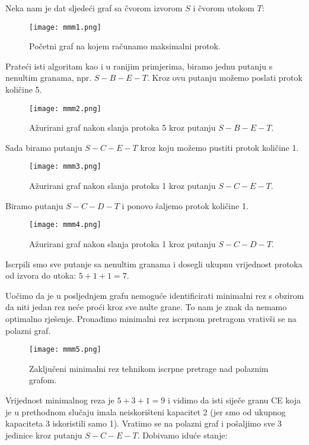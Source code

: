 \documentclass[11pt, a4paper]{article}
\begin{document}
	Neka nam je dat sljedeći graf sa čvorom izvorom $S$ i čvorom utokom $T$:
	
	\begin{figure}[h]
		\centering
		\texttt{[image: mmm1.png]}
		\caption{Početni graf na kojem računamo maksimalni protok.}
		\label{fig:mmm1}
	\end{figure}
	
	Prateći isti algoritam kao i u ranijim primjerima, biramo jednu putanju s nenultim granama, npr. $S-B-E-T$. Kroz ovu putanju možemo poslati protok količine 5.
	
	\begin{figure}[h]
		\centering
		\texttt{[image: mmm2.png]}
		\caption{Ažurirani graf nakon slanja protoka 5 kroz putanju $S-B-E-T$.}
		\label{fig:mmm2}
	\end{figure}
	
	Sada biramo putanju $S-C-E-T$ kroz koju možemo pustiti protok količine 1.
	
	\pagebreak
	\begin{figure}[h]
		\centering
		\texttt{[image: mmm3.png]}
		\caption{Ažurirani graf nakon slanja protoka 1 kroz putanju $S-C-E-T$.}
		\label{fig:mmm3}
	\end{figure}
	
	Biramo putanju $S-C-D-T$ i ponovo šaljemo protok količine 1.
	
	\begin{figure}[h]
		\centering
		\texttt{[image: mmm4.png]}
		\caption{Ažurirani graf nakon slanja protoka 1 kroz putanju $S-C-D-T$.}
		\label{fig:mmm4}
	\end{figure}
	
	Iscrpili smo sve putanje sa nenultim granama i dosegli ukupnu vrijednost protoka od izvora do utoka: $5+1+1=7$.
	
	Uočimo da je u posljednjem grafu nemoguće identificirati minimalni rez s obzirom da niti jedan rez neće proći kroz sve nulte grane. To nam je znak da nemamo optimalno rješenje. Pronađimo minimalni rez iscrpnom pretragom vrativši se na polazni graf.
	
	\pagebreak
	\begin{figure}[h]
		\centering
		\texttt{[image: mmm5.png]}
		\caption{Zaključeni minimalni rez tehnikom iscrpne pretrage nad polaznim grafom.}
		\label{fig:mmm5}
	\end{figure}
	
	Vrijednost minimalnog reza je $5+3+1=9$ i vidimo da isti siječe granu CE koja je u prethodnom slučaju imala neiskorišteni kapacitet 2 (jer smo od ukupnog kapaciteta 3 iskoristili samo 1). Vratimo se na polazni graf i pošaljimo sve 3 jedinice kroz putanju $S-C-E-T$. Dobivamo iduće stanje:
	
\end{document}
